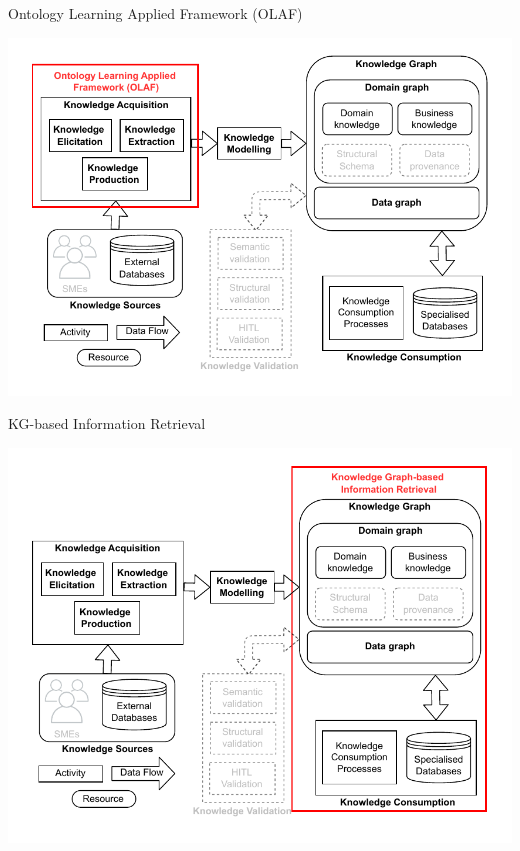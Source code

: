 


\begin{frame}{Ontology Learning Applied Framework (OLAF)}

        \begin{center}
            \includegraphics[scale=0.6]{images/KGBS-knowledge-acquisition-OLAF-legende.pdf} 
        \end{center}

\end{frame}

\begin{frame}{KG-based Information Retrieval}

    \begin{center}
        \includegraphics[scale=0.6]{images/KGBS-knowledge-consumption-industrial-exp-legende.pdf} 
    \end{center}

\end{frame}


